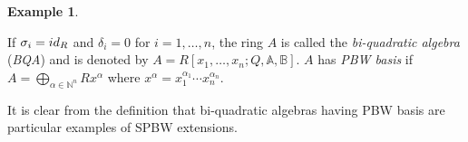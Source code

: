 \documentclass{amsart}
\theoremstyle{definition}
\newtheorem{example}[theorem]{Example}
\theoremstyle{remark}
\numberwithin{equation}{section}
\begin{document}
\begin{example}
\begin{enumerate}
If $\sigma_i = {\rm id}_R$ and $\delta_i = 0$ for $i = 1,\dotsc, n$, the ring $A$ is called the {\em bi-quadratic algebra} ({\em BQA}) and is denoted by $A = R[x_1, \dotsc, x_n; Q, \mathbb{A}, \mathbb{B}]$. $A$ has {\em PBW basis} if $A = \bigoplus\limits_{\alpha \in \mathbb{N}^{n}} Rx^{\alpha}$ where $x^{\alpha} = x_1^{\alpha_1}\dotsb x_n^{\alpha_n}$.

It is clear from the definition that bi-quadratic algebras having PBW basis are particular examples of SPBW extensions.



        
        
        
        

\end{enumerate}
\end{example}
\end{document}
